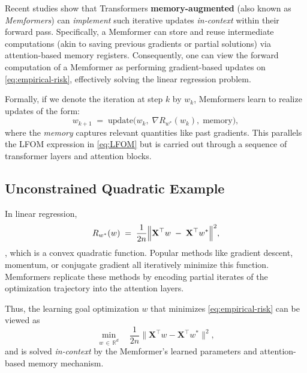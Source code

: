 Recent studies show that Transformers \textbf{ memory-augmented} (also known as \emph{Memformers}) can \emph{implement} such iterative updates \emph{in-context} within their forward pass. Specifically, a Memformer can store and reuse intermediate computations (akin to saving previous gradients or partial solutions) via attention-based memory registers. Consequently, one can view the forward computation of a Memformer as performing gradient-based updates on \eqref{eq:empirical-risk}, effectively solving the linear regression problem. 

Formally, if we denote the iteration at step $k$ by $w_k$, Memformers learn to realize updates of the form:
\[
  w_{k+1} \;=\; \text{update}\bigl(w_k,\;\nabla R_{w^*}(w_k),\;\text{memory}\bigr),
\]
where the \emph{memory} captures relevant quantities like past gradients. This parallels the LFOM expression in \eqref{eq:LFOM} but is carried out through a sequence of transformer layers and attention blocks.

\subsection{Unconstrained Quadratic Example}

In linear regression,
\[   R_{w^*}(w) \;=\; \frac{1}{2n}   \Bigl\|\mathbf{X}^\top w \;-\; \mathbf{X}^\top w^*\Bigr\|^2, \],
which is a convex quadratic function. Popular methods like gradient descent, momentum, or conjugate gradient all iteratively minimize this function. 
Memformers replicate these methods by encoding partial iterates of the optimization trajectory into the attention layers.

Thus, the learning goal optimization $w$ that minimizes \eqref{eq:empirical-risk} can be viewed as
\[
  \min_{w \,\in\, \mathbb{R}^d} \quad 
  \frac{1}{2n}\|\mathbf{X}^\top w - \mathbf{X}^\top w^*\|^2,
\]
and is solved \emph{in-context} by the Memformer’s learned parameters and attention-based memory mechanism.


